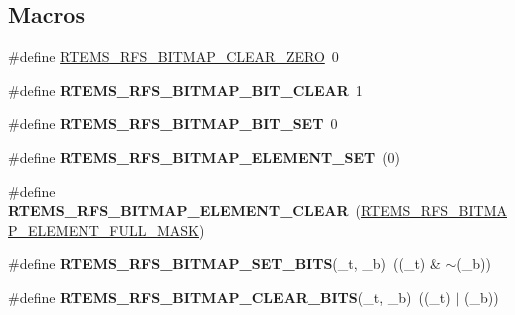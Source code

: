 \subsection*{Macros}
\begin{DoxyCompactItemize}
\item 
\#define \mbox{\hyperlink{rtems-rfs-bitmaps_8h_ae2466cb8aeedf71a7f74bd8f64ff5c83}{R\+T\+E\+M\+S\+\_\+\+R\+F\+S\+\_\+\+B\+I\+T\+M\+A\+P\+\_\+\+C\+L\+E\+A\+R\+\_\+\+Z\+E\+RO}}~0
\item 
\mbox{\label{rtems-rfs-bitmaps_8h_a7481e2cb1b36032c791045087628eb7c}} 
\#define {\bfseries R\+T\+E\+M\+S\+\_\+\+R\+F\+S\+\_\+\+B\+I\+T\+M\+A\+P\+\_\+\+B\+I\+T\+\_\+\+C\+L\+E\+AR}~1
\item 
\mbox{\label{rtems-rfs-bitmaps_8h_a63bb6693b6fbf93504c1b55409acb767}} 
\#define {\bfseries R\+T\+E\+M\+S\+\_\+\+R\+F\+S\+\_\+\+B\+I\+T\+M\+A\+P\+\_\+\+B\+I\+T\+\_\+\+S\+ET}~0
\item 
\mbox{\label{rtems-rfs-bitmaps_8h_a75a8d77a6c3f2a0807ea9049c02af8a1}} 
\#define {\bfseries R\+T\+E\+M\+S\+\_\+\+R\+F\+S\+\_\+\+B\+I\+T\+M\+A\+P\+\_\+\+E\+L\+E\+M\+E\+N\+T\+\_\+\+S\+ET}~(0)
\item 
\mbox{\label{rtems-rfs-bitmaps_8h_aab2ab360bb5686ad2dab463312ddc1a2}} 
\#define {\bfseries R\+T\+E\+M\+S\+\_\+\+R\+F\+S\+\_\+\+B\+I\+T\+M\+A\+P\+\_\+\+E\+L\+E\+M\+E\+N\+T\+\_\+\+C\+L\+E\+AR}~(\mbox{\hyperlink{rtems-rfs-bitmaps_8h_a4bf35eb00bf85c48828951345f140106}{R\+T\+E\+M\+S\+\_\+\+R\+F\+S\+\_\+\+B\+I\+T\+M\+A\+P\+\_\+\+E\+L\+E\+M\+E\+N\+T\+\_\+\+F\+U\+L\+L\+\_\+\+M\+A\+SK}})
\item 
\mbox{\label{rtems-rfs-bitmaps_8h_a5b66f10eb60f4f79a04fb598fd0a7b7e}} 
\#define {\bfseries R\+T\+E\+M\+S\+\_\+\+R\+F\+S\+\_\+\+B\+I\+T\+M\+A\+P\+\_\+\+S\+E\+T\+\_\+\+B\+I\+TS}(\+\_\+t,  \+\_\+b)~((\+\_\+t) \& $\sim$(\+\_\+b))
\item 
\mbox{\label{rtems-rfs-bitmaps_8h_a134612bb6c640929e8b68425e68e93f0}} 
\#define {\bfseries R\+T\+E\+M\+S\+\_\+\+R\+F\+S\+\_\+\+B\+I\+T\+M\+A\+P\+\_\+\+C\+L\+E\+A\+R\+\_\+\+B\+I\+TS}(\+\_\+t,  \+\_\+b)~((\+\_\+t) $\vert$ (\+\_\+b))
\item 
\mbox{\label{rtems-rfs-bitmaps_8h_ab712e01e501236921b6d173b4266206b}} 

\end{DoxyCompactItemize}
